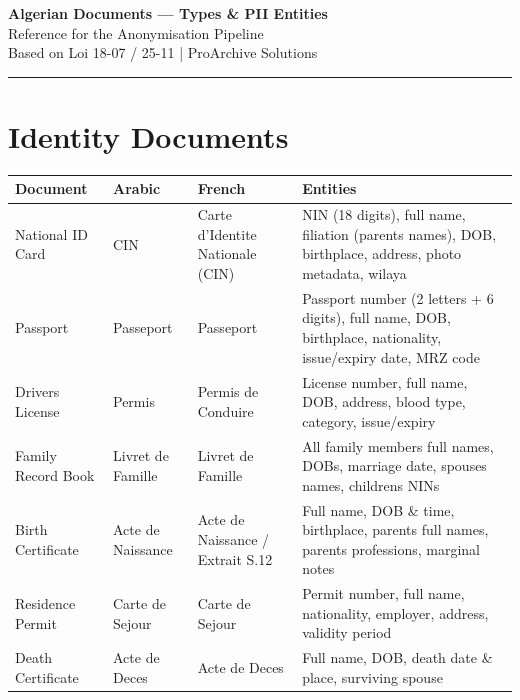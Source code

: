 \documentclass[11pt,a4paper]{article}
\begin{document}
\begin{center}
    {\LARGE\bfseries Algerian Documents --- Types \& PII Entities} \\[6pt]
    {\large Reference for the Anonymisation Pipeline} \\[4pt]
    {\footnotesize Based on Loi 18-07 / 25-11 \hspace{8pt}|\hspace{8pt} ProArchive Solutions}
\end{center}

\hrule
\vspace{12pt}

\tableofcontents
\newpage

\section{Identity Documents}

\begin{longtable}{|p{3.5cm}|p{3.5cm}|p{2.5cm}|p{6cm}|}
\hline
\textbf{Document} & \textbf{Arabic} & \textbf{French} & \textbf{Entities} \\
\hline
\endhead

National ID Card
&
CIN
&
Carte d'Identite Nationale (CIN)
&
NIN (18 digits), full name, filiation (parents names), DOB, birthplace, address, photo metadata, wilaya
\\ \hline

Passport
&
Passeport
&
Passeport
&
Passport number (2 letters + 6 digits), full name, DOB, birthplace, nationality, issue/expiry date, MRZ code
\\ \hline

Drivers License
&
Permis
&
Permis de Conduire
&
License number, full name, DOB, address, blood type, category, issue/expiry
\\ \hline

Family Record Book
&
Livret de Famille
&
Livret de Famille
&
All family members full names, DOBs, marriage date, spouses names, childrens NINs
\\ \hline

Birth Certificate
&
Acte de Naissance
&
Acte de Naissance / Extrait S.12
&
Full name, DOB \& time, birthplace, parents full names, parents professions, marginal notes
\\ \hline

Residence Permit
&
Carte de Sejour
&
Carte de Sejour
&
Permit number, full name, nationality, employer, address, validity period
\\ \hline

Death Certificate
&
Acte de Deces
&
Acte de Deces
&
Full name, DOB, death date \& place, surviving spouse
\\ \hline

\end{longtable}
\end{document}
